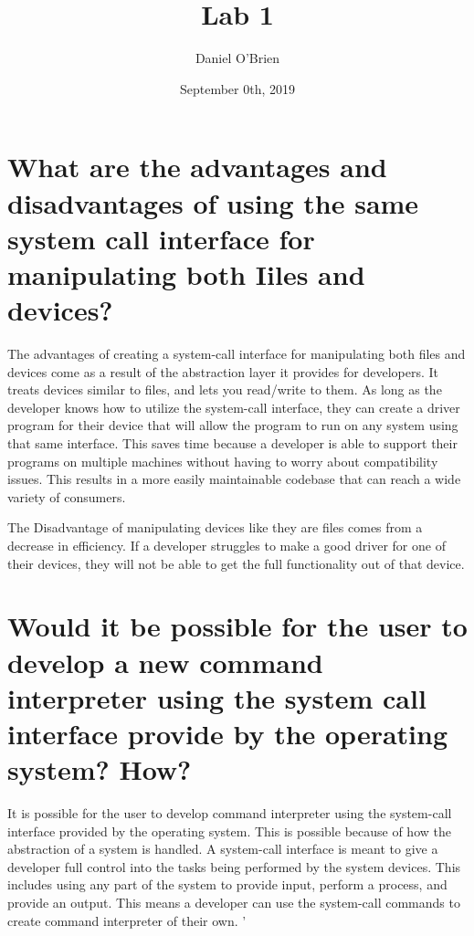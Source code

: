 \documentclass{article}
\title{Lab 1}
\author{Daniel O'Brien }
\date{September 0th, 2019}
\begin{document}
\maketitle

\section{What are the advantages and disadvantages of using the same system call interface for manipulating both Iiles and devices?}

The advantages of creating a system-call interface for manipulating both
files and devices come as a result of the abstraction layer it provides for developers. It treats devices similar to files, and lets you read/write to them. As long as the developer knows how to utilize the system-call interface, they can create a driver program for their device that will allow the program to run on any system using that same interface. This saves time because a developer is able to support their programs on multiple machines without having to worry about compatibility issues. This results in a more easily maintainable codebase that can reach a wide variety of consumers. 

The Disadvantage of manipulating devices like they are files comes from a decrease in efficiency. If a developer struggles to make a good driver for one of their devices, they will not be able to get the full functionality out of that device. 


\section{Would it be possible for the user to develop a new command interpreter using the system call interface provide by the operating system? How?}
It is possible for the user to develop command interpreter using the system-call interface provided by the operating system. This is possible because of how the abstraction of a system is handled. A system-call interface is meant to give a developer full control into the tasks being performed by the system devices. This includes using any part of the system to provide input, perform a process, and provide an output. This means a developer can use the system-call commands to create command interpreter of their own. 
' \citep{opSystem}



\end{document}

